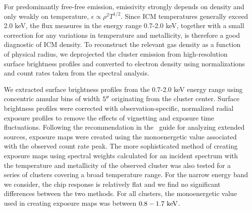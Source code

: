 \documentclass[12pt,preprint]{aastex}
\begin{document}
For predominantly free-free emission, emissivity strongly depends on
density and only weakly on temperature, $\epsilon \propto \rho^2
T^{1/2}$. Since ICM temperatures generally exceed 2.0 keV, the flux
measures in the energy range 0.7-2.0 keV, together with a small
correction for any variations in temperature and metallicity, is
therefore a good diagnostic of ICM density. To reconstruct the
relevant gas density as a function of physical radius, we deprojected
the cluster emission from high-resolution surface brightness profiles
and converted to electron density using normalizations and count rates
taken from the spectral analysis.

We extracted surface brightness profiles from the 0.7-2.0 keV energy
range using concentric annular bins of width $5\mathrm{^\prime}\hskip -0.1em\mathrm{^\prime}$ originating from
the cluster center. Surface brightness profiles were corrected with
observation-specific, normalized radial exposure profiles to remove
the effects of vignetting and exposure time fluctuations. Following
the recommendation in the \ciao\ guide for analyzing extended sources,
exposure maps were created using the monoenergetic value associated
with the observed count rate peak. The more sophisticated method of
creating exposure maps using spectral weights calculated for an
incident spectrum with the temperature and metallicity of the observed
cluster was also tested for a series of clusters covering a broad
temperature range. For the narrow energy band we consider, the chip
response is relatively flat and we find no significant differences
between the two methods. For all clusters, the monoenergetic value
used in creating exposure maps was between $0.8-1.7\mbox{\ensuremath{\mathrm{~keV}}}$.
\end{document}
